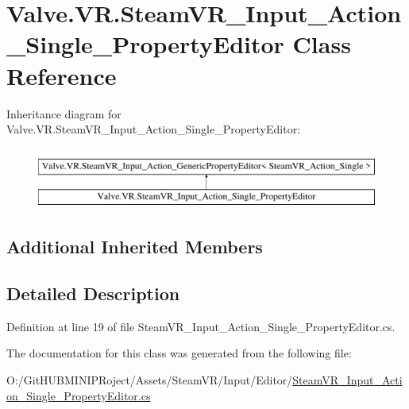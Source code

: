 \hypertarget{class_valve_1_1_v_r_1_1_steam_v_r___input___action___single___property_editor}{}\section{Valve.\+V\+R.\+Steam\+V\+R\+\_\+\+Input\+\_\+\+Action\+\_\+\+Single\+\_\+\+Property\+Editor Class Reference}
\label{class_valve_1_1_v_r_1_1_steam_v_r___input___action___single___property_editor}
Inheritance diagram for Valve.\+V\+R.\+Steam\+V\+R\+\_\+\+Input\+\_\+\+Action\+\_\+\+Single\+\_\+\+Property\+Editor\+:\begin{figure}[H]
\begin{center}
\leavevmode
\includegraphics[height=2.000000cm]{class_valve_1_1_v_r_1_1_steam_v_r___input___action___single___property_editor}
\end{center}
\end{figure}
\subsection*{Additional Inherited Members}


\subsection{Detailed Description}


Definition at line 19 of file Steam\+V\+R\+\_\+\+Input\+\_\+\+Action\+\_\+\+Single\+\_\+\+Property\+Editor.\+cs.



The documentation for this class was generated from the following file\+:\begin{DoxyCompactItemize}
\item 
O\+:/\+Git\+H\+U\+B\+M\+I\+N\+I\+P\+Roject/\+Assets/\+Steam\+V\+R/\+Input/\+Editor/\mbox{\hyperlink{_steam_v_r___input___action___single___property_editor_8cs}{Steam\+V\+R\+\_\+\+Input\+\_\+\+Action\+\_\+\+Single\+\_\+\+Property\+Editor.\+cs}}\end{DoxyCompactItemize}
